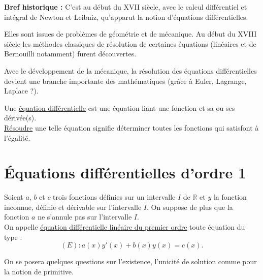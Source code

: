\documentclass[french]{book}
\newcommand{\R}{\mathbb {R}}
\begin{document}
\newpage
\textbf{Bref historique :} C'est au début du  XVII siècle, avec le calcul différentiel et intégral de Newton et
Leibniz, qu'apparut la notion d'équations différentielles.

Elles sont issues de problèmes de géométrie et de
mécanique. Au début du XVIII  siècle les méthodes classiques de résolution de certaines équations
(linéaires et de Bernouilli notamment) furent découvertes.

Avec le développement de la mécanique, la résolution des équations différentielles devient une branche
importante des mathématiques (grâce à Euler, Lagrange, Laplace ?).


Une \underline{équation différentielle} est une équation liant une fonction et sa ou ses dérivée(s).\\
\underline{Résoudre} une telle équation signifie déterminer toutes les fonctions qui satisfont à l'égalité.

\section{Équations différentielles d'ordre 1}

\begin{defn}
Soient $a$, $b$ et $c$ trois fonctions
définies sur un intervalle $I$ de $\R$ et $y$ la fonction inconnue, définie et dérivable sur l'intervalle $I$.
On suppose de plus que la fonction $a$ ne s'annule pas sur l'intervalle $I$. \\
On appelle \underline{équation différentielle linéaire du premier
ordre} toute équation du type :
$$(E):a(x)y'(x)+b(x)y(x) =c(x).$$

\end{defn}

On se posera quelques questions sur l'existence, l'unicité de solution comme pour la notion de primitive.
\end{document}
